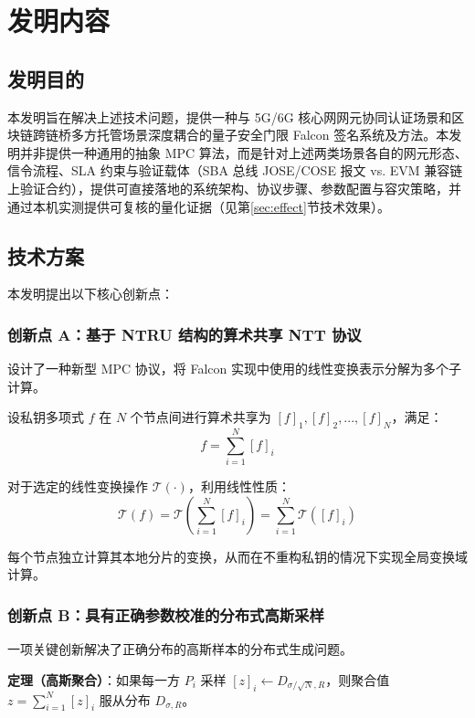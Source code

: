 \documentclass[12pt,a4paper]{article}
\begin{document}
\section{发明内容}

\subsection{发明目的}

本发明旨在解决上述技术问题，提供一种与 5G/6G 核心网网元协同认证场景和区块链跨链桥多方托管场景深度耦合的量子安全门限 Falcon 签名系统及方法。本发明并非提供一种通用的抽象 MPC 算法，而是针对上述两类场景各自的网元形态、信令流程、SLA 约束与验证载体（SBA 总线 JOSE/COSE 报文 vs. EVM 兼容链上验证合约），提供可直接落地的系统架构、协议步骤、参数配置与容灾策略，并通过本机实测提供可复核的量化证据（见第\ref{sec:effect}节技术效果）。

\subsection{技术方案}

本发明提出以下核心创新点：

\subsubsection{创新点 A：基于 NTRU 结构的算术共享 NTT 协议}

设计了一种新型 MPC 协议，将 Falcon 实现中使用的线性变换表示分解为多个子计算。

设私钥多项式 $f$ 在 $N$ 个节点间进行算术共享为 $[f]_1, [f]_2, ..., [f]_N$，满足：
$$f = \sum_{i=1}^{N} [f]_i$$

对于选定的线性变换操作 $\mathcal{T}(\cdot)$，利用线性性质：
$$\mathcal{T}(f) = \mathcal{T}\left(\sum_{i=1}^{N} [f]_i\right) = \sum_{i=1}^{N} \mathcal{T}([f]_i)$$

每个节点独立计算其本地分片的变换，从而在不重构私钥的情况下实现全局变换域计算。

\subsubsection{创新点 B：具有正确参数校准的分布式高斯采样}

一项关键创新解决了正确分布的高斯样本的分布式生成问题。

\textbf{定理（高斯聚合）}：如果每一方 $P_i$ 采样 $[z]_i \leftarrow D_{\sigma/\sqrt{N}, R}$，则聚合值 $z = \sum_{i=1}^{N} [z]_i$ 服从分布 $D_{\sigma, R}$。
\end{document}
